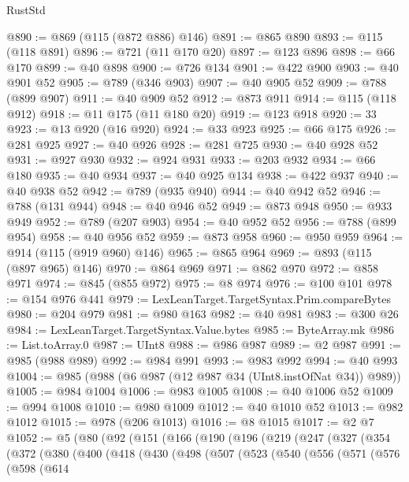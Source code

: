 \begin{lexlean}{RustStd}
\begin{coremodule}
@890 := @869 (@115 (@872 @886) @146)
@891 := @865 @890
@893 := @115 (@118 @891)
@896 := @721 (@11 @170 @20)
@897 := @123 @896
@898 := @66 @170
@899 := @40 @898
@900 := @726 @134
@901 := @422 @900
@903 := @40 @901 @52
@905 := @789 (@346 @903)
@907 := @40 @905 @52
@909 := @788 (@899 @907)
@911 := @40 @909 @52
@912 := @873 @911
@914 := @115 (@118 @912)
@918 := @11 @175 (@11 @180 @20)
@919 := @123 @918
@920 := 33
@923 := @13 @920 (@16 @920)
@924 := @33 @923
@925 := @66 @175
@926 := @281 @925
@927 := @40 @926
@928 := @281 @725
@930 := @40 @928 @52
@931 := @927 @930
@932 := @924 @931
@933 := @203 @932
@934 := @66 @180
@935 := @40 @934
@937 := @40 @925 @134
@938 := @422 @937
@940 := @40 @938 @52
@942 := @789 (@935 @940)
@944 := @40 @942 @52
@946 := @788 (@131 @944)
@948 := @40 @946 @52
@949 := @873 @948
@950 := @933 @949
@952 := @789 (@207 @903)
@954 := @40 @952 @52
@956 := @788 (@899 @954)
@958 := @40 @956 @52
@959 := @873 @958
@960 := @950 @959
@964 := @914 (@115 (@919 @960) @146)
@965 := @865 @964
@969 := @893 (@115 (@897 @965) @146)
@970 := @864 @969
@971 := @862 @970
@972 := @858 @971
@974 := @845 (@855 @972)
@975 := @8 @974
@976 := @100 @101
@978 := @154 @976 @441
@979 := LexLeanTarget.TargetSyntax.Prim.compareBytes
@980 := @204 @979
@981 := @980 @163
@982 := @40 @981
@983 := @300 @26
@984 := LexLeanTarget.TargetSyntax.Value.bytes
@985 := ByteArray.mk
@986 := List.toArray.{0}
@987 := UInt8
@988 := @986 @987
@989 := @2 @987
@991 := @985 (@988 @989)
@992 := @984 @991
@993 := @983 @992
@994 := @40 @993
@1004 := @985 (@988 (@6 @987 (@12 @987 @34 (UInt8.instOfNat @34)) @989))
@1005 := @984 @1004
@1006 := @983 @1005
@1008 := @40 @1006 @52
@1009 := @994 @1008
@1010 := @980 @1009
@1012 := @40 @1010 @52
@1013 := @982 @1012
@1015 := @978 (@206 @1013)
@1016 := @8 @1015
@1017 := @2 @7
@1052 := @5
    (@80
      (@92
        (@151
          (@166
            (@190
              (@196
                (@219
                  (@247
                    (@327
                      (@354
                        (@372
                          (@380
                            (@400
                              (@418
                                (@430
                                  (@498
                                    (@507
                                      (@523
                                        (@540
                                          (@556
                                            (@571
                                              (@576
                                                (@598
                                                  (@614

\end{coremodule}
\end{lexlean}
